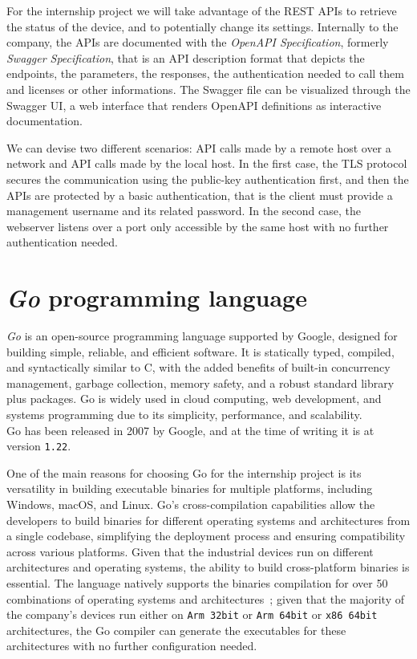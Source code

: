 For the internship project we will take advantage of the REST APIs to retrieve the status of the device, and to potentially change its settings. Internally to the company, the APIs are documented with the \textit{OpenAPI Specification}, formerly \textit{Swagger Specification}, that is an API description format that depicts the endpoints, the parameters, the responses, the authentication needed to call them and licenses or other informations. The Swagger file can be visualized through the Swagger UI, a web interface that renders OpenAPI definitions as interactive documentation.~\cite{openapi-swagger}

We can devise two different scenarios: API calls made by a remote host over a network and API calls made by the local host. In the first case, the TLS protocol secures the communication using the public-key authentication first, and then the APIs are protected by a basic authentication, that is the client must provide a management username and its related password. In the second case, the webserver listens over a port only accessible by the same host with no further authentication needed. 

\section{\textit{Go} programming language}

\textit{Go} is an open-source programming language supported by Google, designed for building simple, reliable, and efficient software. It is statically typed, compiled, and syntactically similar to C, with the added benefits of built-in concurrency management, garbage collection, memory safety, and a robust standard library plus packages. Go is widely used in cloud computing, web development, and systems programming due to its simplicity, performance, and scalability.~\cite{go-lang-site}~\cite{go-lang-wikipedia}\\
Go has been released in 2007 by Google, and at the time of writing it is at version \texttt{1.22}.

One of the main reasons for choosing Go for the internship project is its versatility in building executable binaries for multiple platforms, including Windows, macOS, and Linux. Go's cross-compilation capabilities allow the developers to build binaries for different operating systems and architectures from a single codebase, simplifying the deployment process and ensuring compatibility across various platforms. Given that the industrial devices run on different architectures and operating systems, the ability to build cross-platform binaries is essential. The language natively supports the binaries compilation for over 50 combinations of operating systems and architectures~\cite{go-lang-compilation-combo}; given that the majority of the company's devices run either on \texttt{Arm 32bit} or \texttt{Arm 64bit} or \texttt{x86 64bit} architectures, the Go compiler can generate the executables for these architectures with no further configuration needed.

